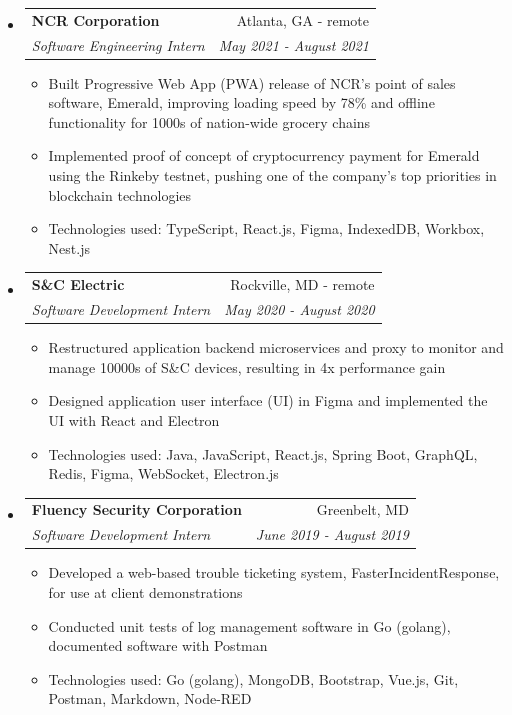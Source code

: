 \documentclass[letterpaper,11pt]{article}
\makeatletter
\newcommand{\resitem}[1]{\item #1 \vspace{-2pt}}
\newcommand{\ressubheading}[4]{
\begin{tabular*}{7.0in}{l@{\extracolsep{\fill}}r}
		\textbf{#1} & #2 \\
		\textit{#3} & \textit{#4} \\
\end{tabular*}\vspace{-6pt}}
\makeatother
\begin{document}
\begin{itemize}
\begin{itemize}
        \resitem{Technologies used: Kotlin, Android SDK, Facebook BUCK, Meta CI/CD}
    \end{itemize}
\item
    \ressubheading{NCR Corporation}{Atlanta, GA - remote}{Software Engineering Intern}{May 2021 - August 2021}
    \begin{itemize}
        \resitem{Built Progressive Web App (PWA) release of NCR's point of sales software, Emerald, improving loading speed by 78\% and offline functionality for 1000s of nation-wide grocery chains}
        \resitem{Implemented proof of concept of cryptocurrency payment for Emerald using the Rinkeby testnet, pushing one of the company's top priorities in blockchain technologies}
        \resitem{Technologies used: TypeScript, React.js, Figma, IndexedDB, Workbox, Nest.js}
    \end{itemize}
\item
    \ressubheading{S\&C Electric}{Rockville, MD - remote}{Software Development Intern}{May 2020 - August 2020}
    \begin{itemize}
        \resitem{Restructured application backend microservices and proxy to monitor and manage 10000s of S\&C devices, resulting in 4x performance gain}
        \resitem{Designed application user interface (UI) in Figma and implemented the UI with React and Electron}
        \resitem{Technologies used: Java, JavaScript, React.js, Spring Boot, GraphQL, Redis, Figma, WebSocket, Electron.js}
    \end{itemize}
\item
    \ressubheading{Fluency Security Corporation}{Greenbelt, MD}{Software Development Intern}{June 2019 - August 2019}
    \begin{itemize}
        \resitem{Developed a web-based trouble ticketing system, FasterIncidentResponse, for use at client demonstrations}
        \resitem{Conducted unit tests of log management software in Go (golang), documented software with Postman}
        \resitem{Technologies used: Go (golang), MongoDB, Bootstrap, Vue.js, Git, Postman, Markdown, Node-RED}
    \end{itemize}
\end{itemize}
\end{document}
